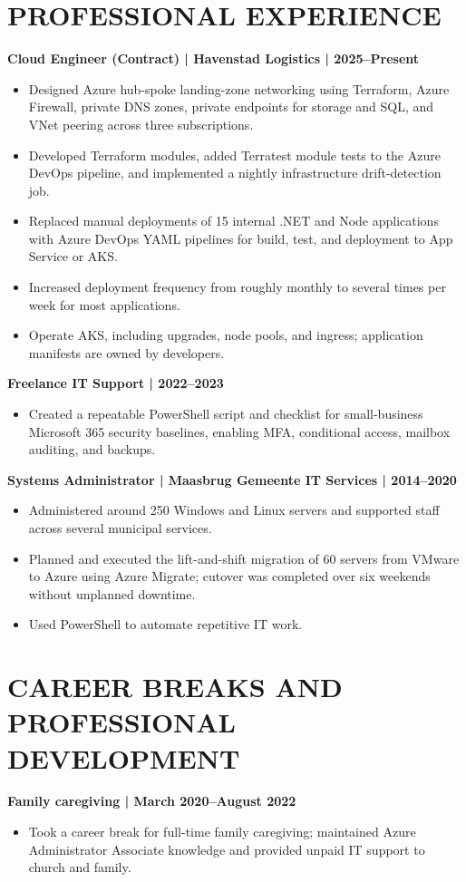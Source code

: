 \documentclass[11pt,a4paper]{article}
\begin{document}
\section*{PROFESSIONAL EXPERIENCE}
\textbf{Cloud Engineer (Contract) | Havenstad Logistics | 2025–Present}
\begin{itemize}
\item Designed Azure hub-spoke landing-zone networking using Terraform, Azure Firewall, private DNS zones, private endpoints for storage and SQL, and VNet peering across three subscriptions.
\item Developed Terraform modules, added Terratest module tests to the Azure DevOps pipeline, and implemented a nightly infrastructure drift-detection job.
\item Replaced manual deployments of 15 internal .NET and Node applications with Azure DevOps YAML pipelines for build, test, and deployment to App Service or AKS.
\item Increased deployment frequency from roughly monthly to several times per week for most applications.
\item Operate AKS, including upgrades, node pools, and ingress; application manifests are owned by developers.
\end{itemize}

\textbf{Freelance IT Support | 2022–2023}
\begin{itemize}
\item Created a repeatable PowerShell script and checklist for small-business Microsoft 365 security baselines, enabling MFA, conditional access, mailbox auditing, and backups.
\end{itemize}

\textbf{Systems Administrator | Maasbrug Gemeente IT Services | 2014–2020}
\begin{itemize}
\item Administered around 250 Windows and Linux servers and supported staff across several municipal services.
\item Planned and executed the lift-and-shift migration of 60 servers from VMware to Azure using Azure Migrate; cutover was completed over six weekends without unplanned downtime.
\item Used PowerShell to automate repetitive IT work.
\end{itemize}

\section*{CAREER BREAKS AND PROFESSIONAL DEVELOPMENT}
\textbf{Family caregiving | March 2020–August 2022}
\begin{itemize}
\item Took a career break for full-time family caregiving; maintained Azure Administrator Associate knowledge and provided unpaid IT support to church and family.
\end{itemize}
\end{document}
